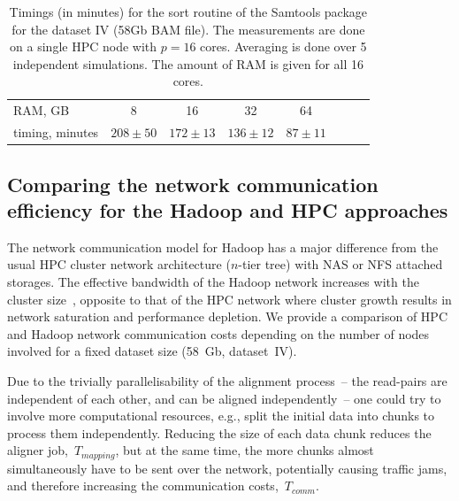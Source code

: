 \documentclass[11pt, oneside]{article}   	%
\begin{document}
 
\begin{table}[htdp]
\small

\caption{Timings (in minutes) for the sort routine of the Samtools package for the dataset IV (58Gb BAM file). The measurements are done on a single HPC node with $p=16$ cores. Averaging is done over 5 independent simulations. The amount of RAM is given for all 16 cores. }
\begin{center}
\begin{tabular}{|l|c|c|c|c|c|c|c|}
RAM, GB		&	8			&		16			&			32		& 		64				\\
timing, minutes	&	$208\pm50$	&	$172\pm13$		&	$136\pm12$		& 	$87\pm11$			\\
\end{tabular}
\end{center}
\label{table:5}
\normalsize
\end{table}%



 \subsection{Comparing the network communication efficiency for the Hadoop and HPC approaches }
The network communication model for Hadoop has a major difference from the usual HPC cluster network architecture ($n$-tier tree) with NAS or NFS attached storages. The effective bandwidth of the Hadoop network increases with the cluster size~\cite{Sammer:2012}, opposite to that of the HPC network where cluster growth results in network saturation and performance depletion.
We provide a comparison of HPC and Hadoop network communication costs depending on the number of nodes involved for a fixed dataset size (58~Gb, dataset~IV).
 
Due to the trivially parallelisability of the alignment process~-- the read-pairs are independent of each other, and can be aligned independently~-- one could try to involve more computational resources, e.g., split the initial data into chunks to process them independently.
Reducing the size of each data chunk reduces the aligner  job,~$T_{mapping}$, but at the same time, the more chunks almost simultaneously have to be sent over the network, potentially causing traffic jams, and therefore increasing the communication costs,~$T_{comm}$.
\end{document}
